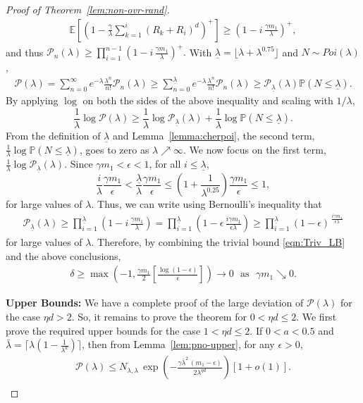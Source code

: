 \documentclass[11pt]{article}
\newcommand{\pp}{\mathbb{P}}
\newcommand{\ee}{\mathbb{E}}
\newcommand{\lt}{\left}
\newcommand{\rt}{\right}
\newcommand{\pno}{\mathcal{P}(\lambda)}
\newcommand{\pnon}{\mathcal{P}_n(\lambda)}
\begin{document}
\begin{appendices}
\begin{proof}[Proof of Theorem~\ref{lem:non-ovr-rand}]
\begin{align*}
\ee\lt[\lt(1 - \frac{\gamma}{\lambda} \sum_{k=1}^{i}(R_k + R_i)^d \rt)^+ \rt] \geq \lt(1 - i\,\frac{\gamma m_1}{\lambda} \rt)^+,
\end{align*}
and thus $\pnon \geq \prod_{i=1}^{n-1} \lt(1 - i\,\frac{\gamma m_1}{\lambda} \rt)^+.$ With $\underline \lambda = \lfloor \lambda + \lambda^{0.75}\rfloor$ and $N \sim Poi(\lambda)$,
\begin{align*}
\pno = \sum_{n=0}^\infty e^{-\lambda} \frac{\lambda^n}{n!} \pnon \geq \sum_{n=0}^{\underline \lambda} e^{-\lambda} \frac{\lambda^n}{n!} \pnon \geq \mathcal{P}_{\underline \lambda}(\lambda) \pp\lt(N \leq \underline{\lambda} \rt).
\end{align*}
By applying $\log$ on both the sides of the above inequality and scaling with $1/\lambda$,
\[
\frac{1}{\lambda} \log \pno \geq \frac{1}{\lambda} \log \mathcal{P}_{\underline \lambda}(\lambda) + \frac{1}{\lambda} \log \pp\lt(N \leq \underline{\lambda} \rt).
\]
From the definition of $\underline \lambda$ and Lemma~\ref{lemma:cherpoi}, the second term, $\frac{1}{\lambda} \log \pp\lt(N \leq \underline{\lambda} \rt)$, goes to zero as $\lambda \nearrow \infty$. We now focus on the first term, $\frac{1}{\lambda} \log \mathcal{P}_{\underline \lambda}(\lambda)$. Since $\gamma m_1  < \epsilon < 1$, for all $i \leq \underline \lambda$,
\[
\frac{i}{\lambda}\frac{\gamma m_1}{\epsilon} < \frac{\underline \lambda}{\lambda}\frac{\gamma m_1}{\epsilon} \leq \lt(1 + \frac{1}{\lambda^{0.25}}\rt)\frac{\gamma m_1}{\epsilon} \leq 1,
\]
for large values of $\lambda$. Thus, we can write using Bernoulli's inequality that
\begin{align*}
\mathcal{P}_{\underline \lambda}(\lambda) \geq \prod_{i=1}^{\underline \lambda} \lt(1 - i\,\frac{\gamma m_1}{\lambda} \rt) = \prod_{i=1}^{\underline \lambda} \lt(1 - \epsilon \,\frac{i \gamma m_1}{\epsilon \lambda} \rt)
\geq \prod_{i=1}^{\underline \lambda}\lt(1 - \epsilon\rt)^{\,\frac{i \gamma m_1}{\epsilon \lambda}}
\end{align*}
for large values of $\lambda$. Therefore, by combining the trivial bound \eqref{eqn:Triv_LB} and the above conclusions,
\begin{align*}
\delta \geq \max\lt( -1, \frac{\gamma m_1}{2} \lt[ \frac{\log(1 - \epsilon)}{\epsilon}\rt] \rt) \longrightarrow 0\,\, \text{ as }\,\, \gamma m_1 \searrow 0.
\end{align*}


\noindent
{\bf Upper Bounds:} We have a complete proof of the large deviation of $\pno$ for the case $\eta d > 2$.
So, it remains to prove the theorem for $0 < \eta d \leq 2$. We first prove the required upper bounds for the case $1 < \eta d \leq 2$.
If $0 < a < 0.5$ and $\bar{\lambda} = \lceil\lambda(1 - \frac{1}{\lambda^a})\rceil$, then from Lemma~\ref{lem:pno-upper}, for any $\epsilon > 0$,
\begin{align}
\label{eqn:pno-upper1}
 \pno  \leq N_{\lambda, \lambda}\, \exp\left( - \frac{\gamma \bar{\lambda}^2\, (m_1 - \epsilon)}{2\lambda^{\eta d}} \right) \lt[ 1 + o(1) \rt].\\
\end{align}



\end{proof}
\end{appendices}
\end{document}
